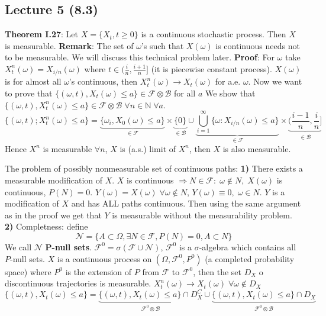 \documentclass[english]{article}
\newcommand{\N}{\mathbb{N}}
\newcommand{\ub}{\underbrace}
\newcommand{\note}[1]{\noindent\textbf{#1}}
\newcommand{\F}{\mathcal F}
\begin{document}
\subsection*{Lecture 5 (8.3)} 
\note{Theorem I.27}: Let $X = \{X_t, t\geq 0\}$ is a continuous stochastic process. Then $X$ is measurable. \newline
\note{Remark}: The set of $\omega$'s such that $X(\omega)$ is continuous needs not to be measurable. We will discuss this technical problem later. \newline
\note{Proof}: For $\omega$ take $X^n_t(\omega) = X_{i/n}(\omega)$ where $t\in \Big( \frac in, \frac {i+1}n]$ (it is piecewise constant process). $X(\omega)$ is for almost all $\omega$'s continuous, then $X^n_t(\omega) \to X_t (\omega)$ for a.e. $\omega$. \newline
Now we want to prove that $\{(\omega ,t), X_t(\omega) \leq a \} \in \F \otimes \mathcal B$ for all $a$ \newline
We show that $\{(\omega, t), X^n_t(\omega) \leq a \} \in \F \otimes \mathcal B \;\forall n \in \N \;\forall a$.
$$\{(\omega, t); X^n_t (\omega) \leq a\} = \ub{\{ \omega_i, X_0(\omega) \leq a\}}_{\in \F} \times \ub{\{0\}}_{\in \mathcal B} \cup \ub{\bigcup^\infty_{i=1} \{\omega: X_{i/n} (\omega) \leq a \}}_{\in \F} \times \ub{\Big( \frac{i-1}n, \frac in \Big]}_{\in \mathcal B}$$
Hence $X^n$ is measurable $\forall n$, $X$ is (a.s.) limit of $X^n$, then $X$ is also measurable. \newline

The problem of possibly nonmeasurable set of continuous paths: \newline
\textbf{1)} There exists a measurable modification of $X$. $X$ is continuous $\Rightarrow N\in \F: \; \omega \notin N,\; X(\omega)$ is continuous, $P(N) = 0$. $Y(\omega) = X(\omega) \; \forall \omega \notin N$, $Y(\omega) \equiv 0,\; \omega \in N$. $Y$ is a modification of $X$ and has ALL paths continuous. Then using the same argument as in the proof we get that $Y$ is measurable without the measurability problem. \newline
\textbf{2)} Completness: define 
$$\mathcal N = \{ A \subset \Omega, \exists N \in \F, P(N) = 0, A\subset N\}$$
We call $\mathcal N$ \textbf{P-null sets}. $\F^0 = \sigma(\F \cup \mathcal N)$, $\F^0$ is a $\sigma$-algebra which contains all $P$-null sets. $X$ is a continuous process on $(\Omega, \F^0, P^0)$ (a completed probability space) where $P^0$ is the extension of $P$ from $\F$ to $\F^0$, then the set $D_X$ o discontinuous trajectories is measurable. \newline
$X^n_t(\omega) \to X_t (\omega)\; \forall \omega \notin D_X$
$$\{(\omega, t), X_t(\omega) \leq a\} = \ub{\{(\omega, t), X_t (\omega) \leq a\} \cap D^C_X}_{\F^0 \otimes \mathcal B} \cup \ub{\{(\omega, t), X_t (\omega) \leq a\} \cap D_X}_{\F^0 \otimes \mathcal B} $$ 
\end{document}
